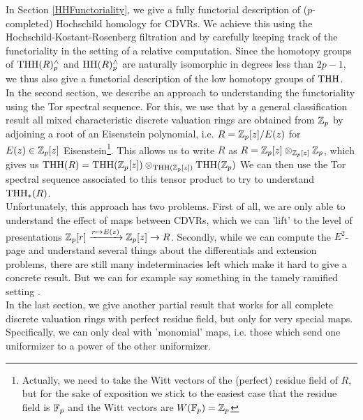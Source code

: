 In Section \ref{HHFunctoriality}, we give a fully functorial description of ($p$-completed) Hochschild homology for CDVRs. We achieve this using the Hochschild-Kostant-Rosenberg filtration and by carefully keeping track of the functoriality in the setting of a relative computation. Since the homotopy groups of $\operatorname{THH}(R)_p^{\wedge}$ and $\operatorname{HH}(R)_p^{\wedge}$ are naturally isomorphic in degrees less than $2p-1$, we thus also give a functorial description of the low homotopy groups of $\operatorname{THH}$.\\
In the second section, we describe an approach to understanding the functoriality using the Tor spectral sequence. 
For this, we use that by a general classification result all mixed characteristic discrete valuation rings are obtained from $\mathbb{Z}_p$ by adjoining a root of an Eisenstein polynomial, i.e. $R=\mathbb{Z}_p[z]/E(z)$ for $E(z)\in \mathbb{Z}_p[z]$ Eisenstein\footnote{Actually, we need to take the Witt vectors of the (perfect) residue field of $R$, but for the sake of exposition we stick to the easiest case that the residue field is $\mathbb{F}_p$ and the Witt vectors are $W(\mathbb{F}_p)=\mathbb{Z}_p$}. 
This allows us to write $R$ as $R=\mathbb{Z}_p[z]\otimes_{\mathbb{Z}_p[z]}\mathbb{Z}_p$, which gives us $\operatorname{THH}(R)=\operatorname{THH}(\mathbb{Z}_p[z])\otimes_{\operatorname{THH}(\mathbb{Z}_p[z])}\operatorname{THH}(\mathbb{Z}_p)$
We can then use the Tor spectral sequence associated to this tensor product to try to understand $\operatorname{THH}_*(R)$.  \\
Unfortunately, this approach has two problems. First of all, we are only able to understand the effect of maps between CDVRs, which we can 'lift' to the level of presentations $\mathbb{Z}_p[r]\xrightarrow{r\mapsto E(z)} \mathbb{Z}_p[z]\rightarrow R$. Secondly, while we can compute the $E^2$-page and understand several things about the differentials and extension problems, there are still many indeterminacies left which make it hard to give a concrete result. But we can for example say something in the tamely ramified setting .\\
In the last section, we give another partial result that works for all complete discrete valuation rings with perfect residue field, but only for very special maps. Specifically, we can only deal with 'monomial' maps, i.e. those which send one uniformizer to a power of the other uniformizer. 


